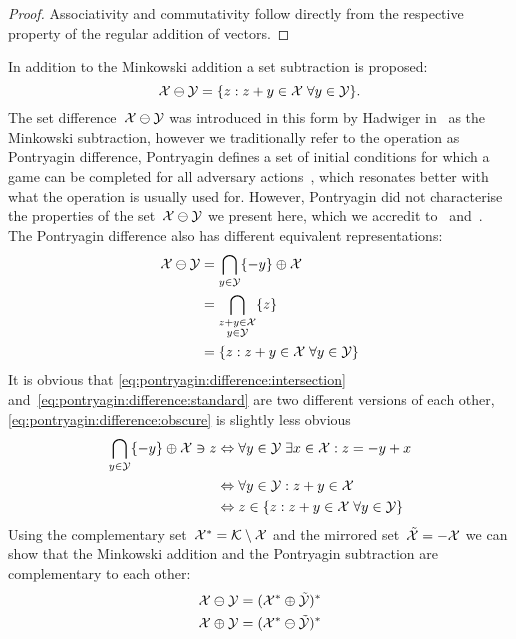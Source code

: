 %
\begin{proof}
Associativity and commutativity follow directly from the respective property of the regular addition of vectors.
\end{proof}
%
\mysplit In addition to the Minkowski addition a set subtraction is proposed:
%
\begin{equation}
	\mathcal X\ominus\mathcal Y = \{z:z+y\in\mathcal X\;\forall y\in\mathcal Y\}.
\end{equation}
%
The set difference~$\mathcal X\ominus\mathcal Y$ was introduced in this form by Hadwiger in~\cite{Hadwiger:1950} as the Minkowski subtraction, however we traditionally refer to the operation as Pontryagin difference, Pontryagin defines a set of initial conditions for which a game can be completed for all adversary actions~\cite{Pontryagin:1966}, which resonates better with what the operation is usually used for.
%
However, Pontryagin did not characterise the properties of the set~$\mathcal X\ominus\mathcal Y$ we present here, which we accredit to~\cite{Hadwiger:1957} and~\cite{Kolmanovsky:1998}.
%
\\[1em]
%
The Pontryagin difference also has different equivalent representations:
%
\begin{align}
\mathcal X\ominus\mathcal Y &= \bigcap_{y\in\mathcal Y} \{-y\}\oplus\mathcal X\label{eq:pontryagin:difference:obscure}\\
&=\bigcap_{\substack{z+y\in\mathcal X\\ y\in\mathcal Y}}\{z\}\label{eq:pontryagin:difference:intersection}\\
&=\{z:z+y\in\mathcal X\;\forall y\in\mathcal Y\}\label{eq:pontryagin:difference:standard}
\end{align}
%
It is obvious that \eqref{eq:pontryagin:difference:intersection} and~\eqref{eq:pontryagin:difference:standard} are two different versions of each other, \eqref{eq:pontryagin:difference:obscure} is slightly less obvious
%
\begin{equation}\begin{aligned}
\bigcap_{y\in\mathcal Y} \{-y\}\oplus\mathcal X \ni z &\Leftrightarrow \forall y\in\mathcal Y\;\exists x\in\mathcal X: z=-y+x\\
 &\Leftrightarrow \forall y\in\mathcal Y: z+y\in\mathcal X\\
 &\Leftrightarrow z\in\{z:z+y\in\mathcal X\;\forall y\in\mathcal Y\}
 \end{aligned}
\end{equation}
%
\mysplit Using the complementary set~$\mathcal X^\ast = \mathcal K\setminus\mathcal X$ and the mirrored set~$\tilde{\mathcal X}=-\mathcal X$ we can show that the Minkowski addition and the Pontryagin subtraction are complementary to each other:
%
\begin{equation}\begin{aligned}
	\mathcal X\ominus\mathcal Y &= (\mathcal X^\ast\oplus\tilde{\mathcal Y})^\ast\\
	\mathcal X\oplus\mathcal Y &=(\mathcal X^\ast\ominus\tilde{\mathcal Y})^\ast
\end{aligned}
\end{equation}
